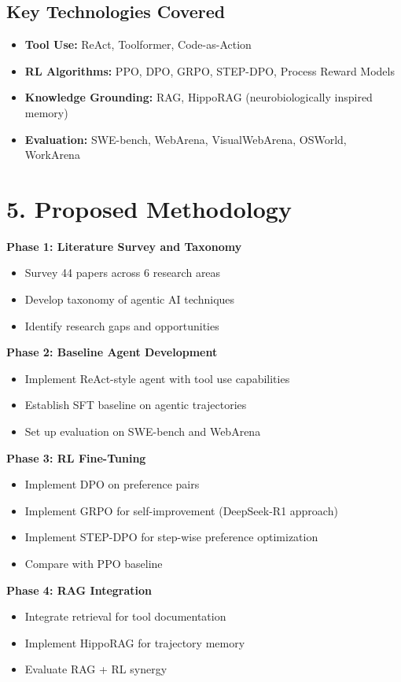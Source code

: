 \documentclass[12pt]{article}
\begin{document}
\subsection*{Key Technologies Covered}
\begin{itemize}
    \item \textbf{Tool Use:} ReAct, Toolformer, Code-as-Action
    \item \textbf{RL Algorithms:} PPO, DPO, GRPO, STEP-DPO, Process Reward Models
    \item \textbf{Knowledge Grounding:} RAG, HippoRAG (neurobiologically inspired memory)
    \item \textbf{Evaluation:} SWE-bench, WebArena, VisualWebArena, OSWorld, WorkArena
\end{itemize}

\section*{5. Proposed Methodology}

\textbf{Phase 1: Literature Survey and Taxonomy}
\begin{itemize}
    \item Survey 44 papers across 6 research areas
    \item Develop taxonomy of agentic AI techniques
    \item Identify research gaps and opportunities
\end{itemize}

\textbf{Phase 2: Baseline Agent Development}
\begin{itemize}
    \item Implement ReAct-style agent with tool use capabilities
    \item Establish SFT baseline on agentic trajectories
    \item Set up evaluation on SWE-bench and WebArena
\end{itemize}

\textbf{Phase 3: RL Fine-Tuning}
\begin{itemize}
    \item Implement DPO on preference pairs
    \item Implement GRPO for self-improvement (DeepSeek-R1 approach)
    \item Implement STEP-DPO for step-wise preference optimization
    \item Compare with PPO baseline
\end{itemize}

\textbf{Phase 4: RAG Integration}
\begin{itemize}
    \item Integrate retrieval for tool documentation
    \item Implement HippoRAG for trajectory memory
    \item Evaluate RAG + RL synergy
\end{itemize}
\end{document}
